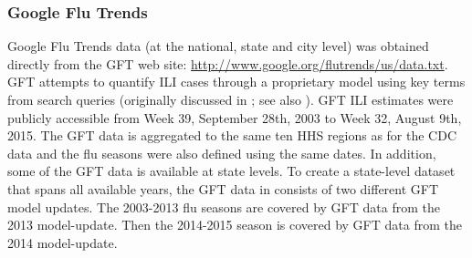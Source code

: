 \documentclass[a4paper]{article}
\begin{document}
\subsubsection{Google Flu Trends}
Google Flu Trends data (at the national, state and city level) was obtained directly from the GFT web site: \url{http://www.google.org/flutrends/us/data.txt}. GFT attempts to quantify ILI cases through a proprietary model using key terms from search queries (originally discussed in \cite{ginsberg2009}; see also \cite{cook2011, copeland2013}).  GFT ILI estimates were publicly accessible from Week 39, September 28th, 2003 to Week 32, August 9th, 2015. The GFT data is aggregated to the same ten HHS regions as for the CDC data and the flu seasons were also defined using the same dates.  In addition, some of the GFT data is available at state levels.  To create a state-level dataset that spans all available years, the GFT data in  consists of two different GFT model updates.  The 2003-2013 flu seasons are covered by GFT data from the 2013 model-update.  Then the 2014-2015 season is covered by GFT data from the 2014 model-update.
\end{document}
